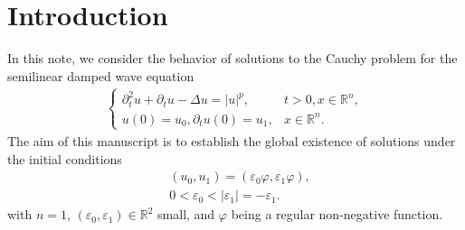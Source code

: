 \documentclass[reqno]{amsart}
\begin{document}
\maketitle

\section{Introduction}

In this note,
we consider the behavior of solutions
to the Cauchy problem for the semilinear damped wave equation
	\begin{align}\label{eq:DW}
	\begin{cases}
    \partial_t^2 u+\partial_t u-\Delta u=|u|^p, & t>0, x \in \mathbb R^n, \\
    u(0)=u_0, \partial_t u(0)=u_1, & x \in \mathbb R^n .
	\end{cases}
	\end{align}
The aim of this manuscript
is to establish the global existence of solutions
under the initial conditions
	\begin{align}\label{eq:initial_condition}
    & \left(u_0, u_1\right)=\left(\varepsilon_0 \varphi, \varepsilon_1 \varphi\right), \\
    & 0 < \varepsilon_0 < |\varepsilon_1| = - \varepsilon_1.
	\end{align}
with $n = 1$, $\left(\varepsilon_0, \varepsilon_1\right) \in \mathbb{R}^2$ small,
and $\varphi$ being a regular non-negative function.
\end{document}
